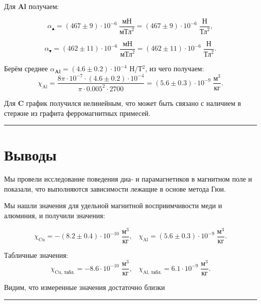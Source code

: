 \documentclass[a4paper,12pt]{article} %
\begin{document}
Для \textbf{Al} получаем:

\[ \alpha_\blacktriangle = (467 \pm 9) \cdot 10^{-6} \; \frac{\text{мН}}{\text{мТл}^2} = (467 \pm 9) \cdot 10^{-6} \; \frac{\text{Н}}{\text{Тл}^2}, \]

\[ \alpha_\blacktriangledown = (462 \pm 11) \cdot 10^{-6} \; \frac{\text{мН}}{\text{мТл}^2} = (462 \pm 11) \cdot 10^{-6} \; \frac{\text{Н}}{\text{Тл}^2}. \]

Берём среднее $\alpha_\textbf{Al} = (4.6 \pm 0.2) \cdot 10^{-4}$ Н/Т$^2$, из чего получаем: 
\[\chi_\text{Al} = \frac{8 \pi \cdot 10^{-7} \cdot (4.6 \pm 0.2) \cdot 10^{-4}}{\pi \cdot 0.005^2 \cdot 2700} = (5.6 \pm 0.3) \cdot 10^{-9}\;\frac{\text{м}^3}{\text{кг}}.\] 

Для \textbf{C} график получился нелинейным, что может быть связано с наличием в стержне из графита ферромагнитных примесей.

\medskip\hrule\medskip


\section{Выводы}

Мы провели исследование поведения диа- и парамагнетиков в магнитном поле и показали, что выполняются зависимости лежащие в основе метода Гюи. 

Мы нашли значения для удельной магнитной восприимчивости меди и алюминия, и получили значения:

\[\chi_\text{Cu} = - (8.2 \pm 0.4) \cdot 10^{-10}\;\frac{\text{м}^3}{\text{кг}}, \;\;\; \chi_\text{Al} = (5.6 \pm 0.3) \cdot 10^{-9}\;\frac{\text{м}^3}{\text{кг}}.\]

Табличные значения: 
\[\chi_\text{Cu, табл.} = - 8.6 \cdot 10^{-10}\;\frac{\text{м}^3}{\text{кг}}, \;\;\; \chi_\text{Al, табл.} = 6.1 \cdot 10^{-9}\;\frac{\text{м}^3}{\text{кг}}.\]

Видим, что измеренные значения достаточно близки 

\medskip\hrule\medskip
\end{document}
